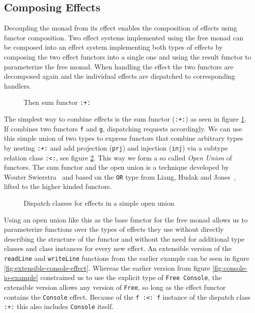 \subsection{Composing Effects}

\label{sec:simple-effect-composition}

Decoupling the monad from its effect enables the composition of
effects using functor composition. Two effect systems implemented
using the free monad can be composed into an effect system
implementing both types of effects by composing the two effect
functors into a single one and using the result functor to
parameterize the free monad. When handling the effect the two functors
are decomposed again and the individual effects are dispatched to
corresponding handlers.

\begin{figure}
  
  \caption{Then sum functor \texttt{:+:}}
  \label{fig:sum-functor}
\end{figure}

The simplest way to combine effects is the sum functor (\texttt{:+:}) as seen in
figure \ref{fig:sum-functor}. If combines two functors \texttt{f} and
\texttt{g}, dispatching requests accordingly. We can use this simple union of
two types to express functors that combine arbitrary types by nesting
\texttt{:+:} and add projection (\texttt{prj}) and injection (\texttt{inj}) via
a subtype relation class \texttt{:<:}, see figure \ref{fig:dispatch-class}. This
way we form a so called \emph{Open Union} of functors. The sum functor and the
open union is a technique developed by Wouter
Swierstra~\cite{data-types-a-la-carte} and based on the \texttt{OR} type from
Liang, Hudak and Jones~\cite{monad-transformers}, lifted to the higher kinded
functors.

\begin{figure}
  
  \caption{Dispatch classes for effects in a simple open union}
  \label{fig:dispatch-class}
\end{figure}

Using an open union like this as the base functor for the free monad allows us
to parameterize functions over the types of effects they use without directly
describing the structure of the functor and without the need for additional type
classes and class instances for every new effect. An extensible version of the
\texttt{readLine} and \texttt{writeLine} functions from the earlier example can
be seen in figure \ref{fig:extensible-console-effect}. Whereas the earlier
version from figure \ref{fig:console-io-example} constrained us to use the
explicit type of \texttt{Free Console}, the extensible version allows any
version of \texttt{Free}, so long as the effect functor contains the
\texttt{Console} effect. Because of the \texttt{f :<: f} instance of the
dispatch class \texttt{:+:} this also includes \texttt{Console} itself.

